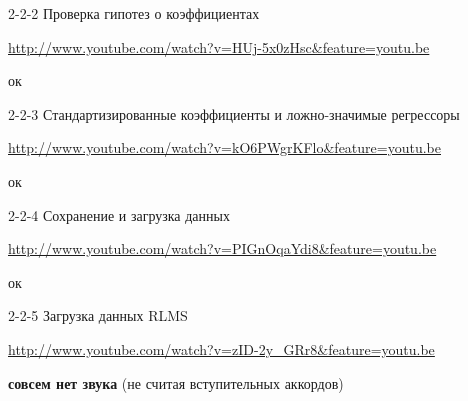 \documentclass[12pt,a4paper]{article}
\begin{document}
2-2-2  Проверка гипотез о коэффициентах

\url{http://www.youtube.com/watch?v=HUj-5x0zHsc&feature=youtu.be}

ок

2-2-3 Стандартизированные коэффициенты и ложно-значимые регрессоры

\url{http://www.youtube.com/watch?v=kO6PWgrKFlo&feature=youtu.be}

ок

2-2-4 Сохранение и загрузка данных

\url{http://www.youtube.com/watch?v=PIGnOqaYdi8&feature=youtu.be}

ок

2-2-5 Загрузка данных RLMS

\url{http://www.youtube.com/watch?v=zID-2y_GRr8&feature=youtu.be}

\textbf{совсем нет звука} (не считая вступительных аккордов)
\end{document}
